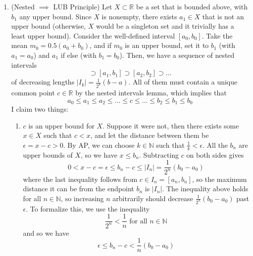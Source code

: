 \begin{solution}
\begin{enumerate}
      \item (Nested $\implies$ LUB Principle) Let $X \subset \mathbb{R}$ be a set that is bounded above, with $b_1$ any upper bound. Since $X$ is nonempty, there exists $a_1 \in X$ that is not an upper bound (otherwise, $X$ would be a singleton set and it trivially has a least upper bound). Consider the well-defined interval $[a_0, b_0]$. Take the mean $m_0 = 0.5 (a_0 + b_0)$, and if $m_0$ is an upper bound, set it to $b_1$ (with $a_1 = a_0$) and $a_1$ if else (with $b_1 = b_0$). Then, we have a sequence of nested intervals 
      \begin{equation}
        [a_0, b_0] \supset [a_1, b_1] \supset [a_2, b_2] \supset \ldots
      \end{equation}
      of decreasing lengths $|I_k| = \frac{1}{2^{k}} (b - a)$. All of them must contain a unique common point $c \in \mathbb{R}$ by the nested intervals lemma, which implies that 
      \begin{equation}
        a_0 \leq a_1 \leq a_2 \leq \ldots \leq c \leq \ldots \leq b_2 \leq b_1 \leq b_0
      \end{equation}
      I claim two things: 
      \begin{enumerate}
          \item $c$ is an upper bound for $X$. Suppose it were not, then there exists some $x \in X$ such that $c < x$, and let the distance between them be $\epsilon = x - c > 0$. By AP, we can choose $k \in \mathbb{N}$ such that $\frac{1}{k} < \epsilon$. All the $b_n$ are upper bounds of $X$, so we have $x \leq b_n$. Subtracting $c$ on both sides gives 
          \begin{equation}
            0 < x - c = \epsilon \leq b_n - c \leq |I_n| = \frac{1}{2^n} (b_0 - a_0)
          \end{equation}
          where the last inequality follows from $c \in I_n = [a_n, b_n]$, so the maximum distance it can be from the endpoint $b_n$ is $|I_n|$. The inequality above holds for all $n \in \mathbb{N}$, so increasing $n$ arbitrarily should decrease $\frac{1}{2^n} (b_0 - a_0)$ past $\epsilon$. To formalize this, we use the inequality
          \begin{equation}
            \frac{1}{2^n} < \frac{1}{n} \text{ for all } n \in \mathbb{N}
          \end{equation}
          and so we have 
          \begin{equation}
            \epsilon \leq b_n - c < \frac{1}{n} (b_0 - a_0)
          \end{equation}

\end{enumerate}
\end{enumerate}
\end{solution}
